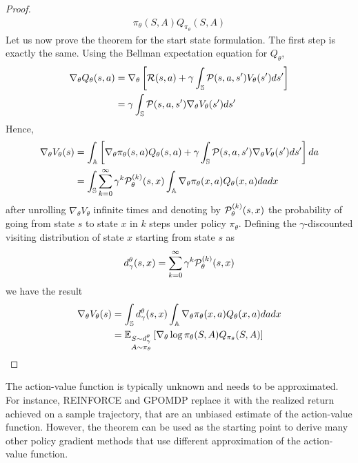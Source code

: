 \begin{proof}
\begin{equation*}
\begin{split}
{				\pi_\theta(S,A) Q_{\pi_\theta}(S, A)} 
		\end{split}
	\end{equation*}
	Let us now prove the theorem for the start state formulation. The first step is exactly the same. Using the Bellman expectation equation for $Q_\theta$, 
	\begin{equation*}
		\begin{split}
			\nabla_\theta Q_\theta(s,a) &= \nabla_\theta \left[ \calR(s,a) + \gamma \int_{\S} \calP(s,a,s') V_\theta(s') ds' \right]\\ 
			&= \gamma \int_{\S} \calP(s,a,s') \nabla_\theta V_\theta(s') ds'
		\end{split}
	\end{equation*}
	Hence,
	\begin{equation*}
		\begin{split}
			\nabla_\theta V_\theta(s) &= \int_{\A} \left[ \nabla_\theta \pi_\theta(s,a) Q_\theta(s,a) + \gamma \int_{\S} \calP(s,a,s') \nabla_\theta V_\theta(s') ds' \right] da\\
			&= \int_\S  \sum_{k=0}^{\infty} \gamma^k \calP_\theta^{(k)}(s, x) \int_{\A} \nabla_\theta \pi_\theta(x,a) Q_\theta(x,a) da dx 
		\end{split}
	\end{equation*} 
	after unrolling $\nabla_\theta V_\theta$ infinite times and denoting by $\calP_\theta^{(k)}(s, x)$ the probability of going from state $s$ to state $x$ in $k$ steps under policy $\pi_\theta$.
	Defining the $\gamma$-discounted visiting distribution of state $x$ starting from state $s$ as
	\begin{equation*}
		d_\gamma^\theta(s, x) = \sum_{k=0}^{\infty} \gamma^k \calP_\theta^{(k)}(s, x)
	\end{equation*}
	we have the result
	\begin{equation*}
		\begin{split}
			\nabla_\theta V_\theta(s) &= \int_\S d_\gamma^\theta(s, x) \int_{\A} \nabla_\theta \pi_\theta(x,a) Q_\theta(x,a) da dx\\
			&= \E[\substack{S \sim d_\gamma^\theta\\A \sim \pi_\theta}]{\nabla_\theta\log
							\pi_\theta(S,A) Q_{\pi_\theta}(S, A)}  
		\end{split}
	\end{equation*} 
	
\end{proof}

The action-value function is typically unknown and needs to
be approximated. For instance, REINFORCE and GPOMDP replace it with the realized return
achieved on a sample trajectory, that are an unbiased estimate of the
action-value function. However, the theorem can be used as the starting point
to derive many other policy gradient methods that use different approximation
of the action-value function.

